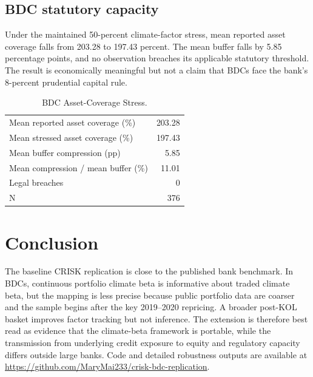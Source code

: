 \documentclass[11pt]{article}
\begin{document}
\subsection{BDC statutory capacity}

Under the maintained 50-percent climate-factor stress, mean reported asset coverage falls from 203.28 to 197.43 percent. The mean buffer falls by 5.85 percentage points, and no observation breaches its applicable statutory threshold. The result is economically meaningful but not a claim that BDCs face the bank's 8-percent prudential capital rule.

\begin{table}[H]
\centering
\caption{BDC Asset-Coverage Stress.\label{tab:stress}}
\small
\begin{tabular}{lr}
\toprule\toprule
Mean reported asset coverage (\%) & 203.28 \\
Mean stressed asset coverage (\%) & 197.43 \\
Mean buffer compression (pp) & 5.85 \\
Mean compression / mean buffer (\%) & 11.01 \\
Legal breaches & 0 \\
N & 376 \\
\bottomrule\bottomrule
\end{tabular}
\end{table}

\section{Conclusion}

The baseline CRISK replication is close to the published bank benchmark. In BDCs, continuous portfolio climate beta is informative about traded climate beta, but the mapping is less precise because public portfolio data are coarser and the sample begins after the key 2019--2020 repricing. A broader post-KOL basket improves factor tracking but not inference. The extension is therefore best read as evidence that the climate-beta framework is portable, while the transmission from underlying credit exposure to equity and regulatory capacity differs outside large banks. Code and detailed robustness outputs are available at \url{https://github.com/MaryMai233/crisk-bdc-replication}.
\end{document}
